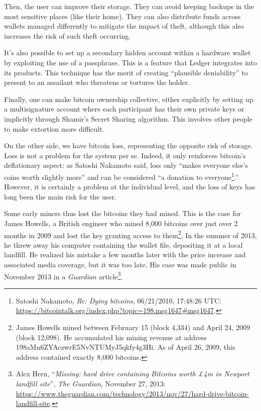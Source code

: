 \documentclass[
  a5paper,
  smalldemyvopaper,10pt,twoside,onecolumn,openright,extrafontsizes,hidelinks]{memoir}
\begin{document}
Then, the user can improve their storage. They can avoid keeping backups
in the most sensitive places (like their home). They can also distribute
funds across wallets managed differently to mitigate the impact of
theft, although this also increases the risk of such theft occurring.

It's also possible to set up a secondary hidden account within a
hardware wallet by exploiting the use of a passphrase. This is a feature
that Ledger integrates into its products. This technique has the merit
of creating ``plausible deniability'' to present to an assailant who
threatens or tortures the holder.

Finally, one can make bitcoin ownership collective, either explicitly by
setting up a multisignature account where each participant has their own
private keys or implicitly through Shamir's Secret Sharing algorithm.
This involves other people to make extortion more difficult.

On the other side, we have bitcoin loss, representing the opposite risk
of storage. Loss is not a problem for the system per se. Indeed, it only
reinforces bitcoin's deflationary aspect: as Satoshi Nakamoto said, loss
only ``makes everyone else's coins worth slightly more'' and can be
considered ``a donation to everyone\footnote{Satoshi Nakamoto, \emph{Re:
  Dying bitcoins}, 06/21/2010, 17:48:26 UTC:
  \url{https://bitcointalk.org/index.php?topic=198.msg1647\#msg1647}.}.''
However, it is certainly a problem at the individual level, and the loss
of keys has long been the main risk for the user.

Some early miners thus lost the bitcoins they had mined. This is the
case for James Howells, a British engineer who mined 8,000 bitcoins over
just over 2 months in 2009 and lost the key granting access to
them\footnote{James Howells mined between February 15 (block 4,334) and
  April 24, 2009 (block 12,098). He accumulated his mining revenue at
  address 198aMn6ZYAczwrE5NvNTUMyJ5qkfy4g3Hi. As of April 26, 2009, this
  address contained exactly 8,000 bitcoins.}. In the summer of 2013, he
threw away his computer containing the wallet file, depositing it at a
local landfill. He realized his mistake a few months later with the
price increase and associated media coverage, but it was too late. His
case was made public in November 2013 in a \emph{Guardian}
article\footnote{Alex Hern, ``\emph{Missing: hard drive containing
  Bitcoins worth £4m in Newport landfill site}'', \emph{The Guardian},
  November 27, 2013:
  \url{https://www.theguardian.com/technology/2013/nov/27/hard-drive-bitcoin-landfill-site}.}.
\end{document}
